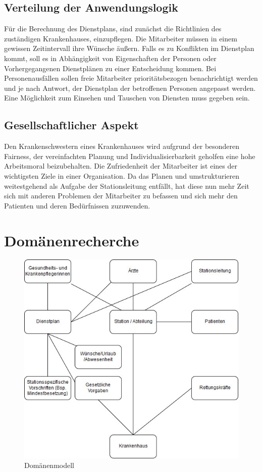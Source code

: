 \documentclass[10pt,a4paper]{article}
\begin{document}
\subsection{Verteilung der Anwendungslogik}
Für die Berechnung des Dienstplans, sind zunächst die Richtlinien des zuständigen Krankenhauses, einzupflegen. Die Mitarbeiter müssen in einem gewissen Zeitintervall ihre Wünsche äußern. Falls es zu Konflikten im Dienstplan kommt, soll es in Abhängigkeit von Eigenschaften der Personen oder Vorhergegangenen Dienstplänen zu einer Entscheidung kommen. Bei Personenausfällen sollen freie Mitarbeiter prioritätsbezogen benachrichtigt werden und je nach Antwort, der Dienstplan der betroffenen Personen angepasst werden. Eine Möglichkeit zum Einsehen und Tauschen von Diensten muss gegeben sein.
\subsection{Gesellschaftlicher Aspekt}
Den Krankenschwestern eines Krankenhauses wird aufgrund der besonderen Fairness, der vereinfachten Planung und Individualisierbarkeit geholfen eine hohe Arbeitsmoral beizubehalten. Die Zufriedenheit der Mitarbeiter ist eines der wichtigsten Ziele in einer Organisation. Da das Planen und umstrukturieren weitestgehend als Aufgabe der Stationsleitung entfällt, hat diese nun mehr Zeit sich mit anderen Problemen der Mitarbeiter zu befassen und sich mehr den Patienten und deren Bedürfnissen zuzuwenden.
\section{Domänenrecherche}
\begin{figure}[H]
\includegraphics[scale=0.6]{Bilder/Domaenenmodell.jpg}{\centering}
\caption{Domänenmodell}
\end{figure}
\end{document}
